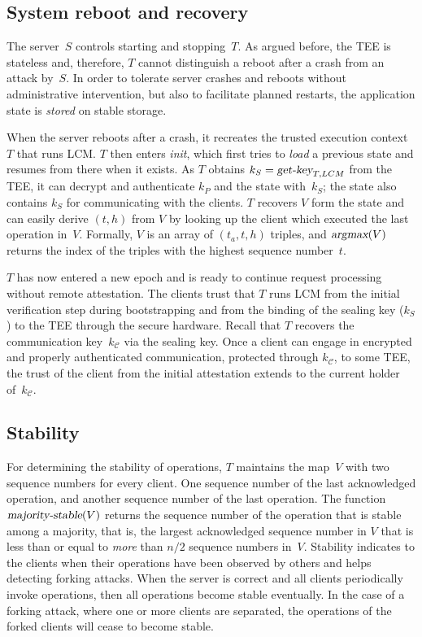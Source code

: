\documentclass[11pt]{article}
\theoremstyle{plain-boldhead}
\theoremstyle{definition-boldhead}
\newcommand{\op}[1]{\textsl{#1}}
\newcommand{\CC}{\ensuremath{\mathcal{C}}\xspace}
\newcommand{\pp}{LCM\xspace}
\begin{document}
\subsection{System reboot and recovery}

The server~$S$ controls starting and stopping~$T$.  As argued before, the
TEE is stateless and, therefore, $T$ cannot distinguish a reboot after a
crash from an attack by~$S$.  In order to tolerate server crashes and
reboots without administrative intervention, but also to facilitate planned
restarts, the application state is \op{stored} on stable storage.

When the server reboots after a crash, it recreates the trusted execution
context~$T$ that runs \pp.  $T$ then enters \op{init}, which first tries
to \op{load} a previous state and resumes from there when it
exists.  As $T$ obtains $k_S = \op{get-key}_{T,\pp}$ from the TEE, it can
decrypt and authenticate $k_P$ and the state with~$k_S$; the state also
contains $k_S$ for communicating with the clients.  $T$ recovers $V$ form
the state and can easily derive $(t, h)$ from $V$ by looking up the client
which executed the last operation in~$V$.  Formally, $V$ is an array of
$(t_a, t, h)$ triples, and $\op{argmax}(V)$ returns the index of the triples
with the highest sequence number~$t$.

$T$ has now entered a new epoch and is ready to continue request processing
without remote attestation.  The clients trust that $T$ runs \pp from the
initial verification step during bootstrapping and from the binding of the
sealing key ($k_S$) to the TEE through the secure hardware.  Recall that
$T$ recovers the communication key~$k_\CC$ via the sealing key.  Once a
client can engage in encrypted and properly authenticated communication,
protected through $k_\CC$, to some TEE, the trust of the client from the
initial attestation extends to the current holder of~$k_\CC$.


\subsection{Stability}

For determining the stability of operations, $T$ maintains the map~$V$ with
two sequence numbers for every client. One sequence number of the last
acknowledged operation, and another sequence number of the last operation.
% 
The function $\op{majority-stable}(V)$ returns the sequence number of the
operation that is stable among a majority, that is, the largest acknowledged
sequence number in $V$ that is less than or equal to \emph{more}
than $n/2$ sequence numbers in~$V$.
% 
Stability indicates to the clients when their operations have been observed
by others and helps detecting forking attacks.  When the server is correct
and all clients periodically invoke operations, then all operations become
stable eventually.  In the case of a forking attack, where one or more
clients are separated, the operations of the forked clients will cease
to become stable.
% 
\end{document}
